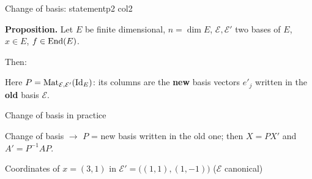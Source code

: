 \documentclass[course,noautoquant,noautokw]{neyvia-study}
\begin{document}
\begin{concept}[1.54]{Change of basis: statement}{p2 col2}
\begin{definition}
\noindent \textbf{Proposition.} Let $E$ be finite dimensional, $n=\dim E$, $\mathcal E,\mathcal E'$ two bases of $E$, $x\in E$, $f\in\operatorname{End}(E)$.
\par\noindent Then:
\par\noindent Here $P=\operatorname{Mat}_{\mathcal E,\mathcal E'}(\mathrm{Id}_E)$: its columns are the \textbf{new} basis vectors $e'_j$ written in the \textbf{old} basis $\mathcal E$.
\end{definition}
\begin{method}{Change of basis in practice}
\end{method}
\begin{reflex}
Change of basis \ensuremath{\rightarrow} $P$ = new basis written in the old one; then $X=PX'$ and $A'=P^{-1}AP$.
\end{reflex}
\begin{worked}{Coordinates of $x=(3,1)$ in $\mathcal E'=\big((1,1),(1,-1)\big)$ ($\mathcal E$ canonical)}

\end{worked}
\end{concept}
\end{document}
